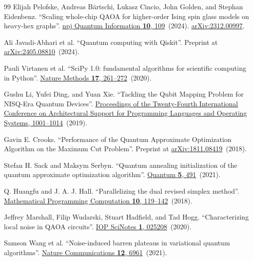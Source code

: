 \documentclass[a4paper,onecolumn,11pt,unpublished]{quantumarticle}
\theoremstyle{remark}
\begin{document}
\begin{thebibliography}{99}
Elijah Pelofske, Andreas B{\"a}rtschi, Lukasz Cincio, John Golden, and Stephan Eidenbenz.
\newblock ``Scaling whole-chip QAOA for higher-order Ising spin glass models on heavy-hex graphs''.
\newblock \href{https://dx.doi.org/10.1038/s41534-024-00906-w}{npj Quantum Information {\bf 10}, 109}~(2024).
\newblock \href{http://arxiv.org/abs/2312.00997}{arXiv:2312.00997}.

Ali Javadi-Abhari et al.
\newblock ``Quantum computing with Qiskit''.
\newblock Preprint at \href{https://arxiv.org/abs/2405.08810}{arXiv:2405.08810}~(2024).


Pauli Virtanen et al.
\newblock ``SciPy 1.0: fundamental algorithms for scientific computing in Python''.
\newblock \href{https://doi.org/10.1038/s41592-019-0686-2}{Nature Methods {\bf 17}, 261--272}~(2020).


Gushu Li, Yufei Ding, and Yuan Xie.
\newblock ``Tackling the Qubit Mapping Problem for NISQ-Era Quantum Devices''.
\newblock \href{https://doi.org/10.1145/3297858.3304023}{Proceedings of the Twenty-Fourth International Conference on Architectural Support for Programming Languages and Operating Systems, 1001--1014}~(2019).


Gavin E. Crooks.
\newblock ``Performance of the Quantum Approximate Optimization Algorithm on the Maximum Cut Problem''.
\newblock Preprint at \href{https://arxiv.org/abs/1811.08419}{arXiv:1811.08419}~(2018).


Stefan H. Sack and Maksym Serbyn.
\newblock ``Quantum annealing initialization of the quantum approximate optimization algorithm''.
\newblock \href{https://doi.org/10.22331/q-2021-07-01-491}{Quantum {\bf 5}, 491}~(2021).


Q. Huangfu and J. A. J. Hall.
\newblock ``Parallelizing the dual revised simplex method''.
\newblock \href{https://doi.org/10.1007/s12532-017-0130-5}{Mathematical Programming Computation {\bf 10}, 119--142}~(2018).


Jeffrey Marshall, Filip Wudarski, Stuart Hadfield, and Tad Hogg.
\newblock ``Characterizing local noise in QAOA circuits''.
\newblock \href{https://doi.org/10.1088/2633-1357/abb0d7}{IOP SciNotes {\bf 1}, 025208}~(2020).


Samson Wang et al.
\newblock ``Noise-induced barren plateaus in variational quantum algorithms''.
\newblock \href{https://doi.org/10.1038/s41467-021-27045-6}{Nature Communications {\bf 12}, 6961}~(2021).



\end{thebibliography}
\end{document}
